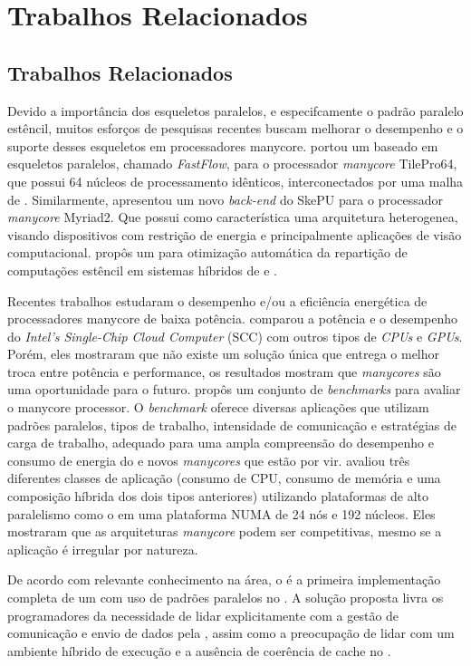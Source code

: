 \chapter[Trabalhos Relacionados]{Trabalhos Relacionados}


\section{Trabalhos Relacionados}

Devido a importância dos esqueletos paralelos, e especifcamente o padrão paralelo estêncil, muitos esforços de pesquisas recentes buscam melhorar o desempenho e o suporte desses esqueletos em processadores manycore. \cite{buono13} portou um \fw baseado em esqueletos paralelos, chamado \textit{FastFlow}, para o processador \textit{manycore} TilePro64, que possui 64 núcleos de processamento idênticos, interconectados por uma malha de \noc. Similarmente, \cite{thoraransen16} apresentou um novo \textit{back-end} do \fw SkePU para o processador \textit{manycore} Myriad2. Que possui como característica uma arquitetura heterogenea, visando dispositivos com restrição de energia e principalmente aplicações de visão computacional. \cite{gysi15} propôs um \fw para otimização automática da repartição de computações estêncil em sistemas híbridos de \cpu e \gpu.

Recentes trabalhos estudaram o desempenho e/ou a eficiência energética de processadores manycore de baixa potência. \cite{SCCEnergy:2012}  comparou a potência e o desempenho do \textit{Intel's Single-Chip Cloud Computer} (SCC) com outros tipos de \textit{CPUs} e \textit{GPUs}. Porém, eles mostraram que não existe um solução única que entrega o melhor troca entre potência e performance, os resultados mostram que \textit{manycores} são uma oportunidade para o futuro. \cite{Castro-Souza-CCPE:2016} propôs um conjunto de \textit{benchmarks} para avaliar o \mppa manycore processor. O \textit{benchmark} oferece diversas aplicações que utilizam padrões paralelos, tipos de trabalho, intensidade de comunicação e estratégias de carga de trabalho, adequado para uma ampla compreensão do desempenho e consumo de energia do \mppa e novos \textit{manycores} que estão por vir. \cite{francesquini:hal-01092325} avaliou três diferentes classes de aplicação (consumo de CPU, consumo de memória e uma composição híbrida dos dois tipos anteriores) utilizando plataformas de alto paralelismo como o \mppa em uma plataforma NUMA de 24 nós e 192 núcleos. Eles mostraram que as arquiteturas \textit{manycore} podem ser competitivas, mesmo se a aplicação é irregular por natureza.

De acordo com relevante conhecimento na área, o \pskelmppa é a primeira implementação completa de um \fw com uso de padrões paralelos no \mppa. A solução proposta livra os programadores da necessidade de lidar explicitamente com a gestão de comunicação e envio de dados pela \noc, assim como a preocupação de lidar com um ambiente híbrido de execução e a ausência de coerência de cache no \mppa.